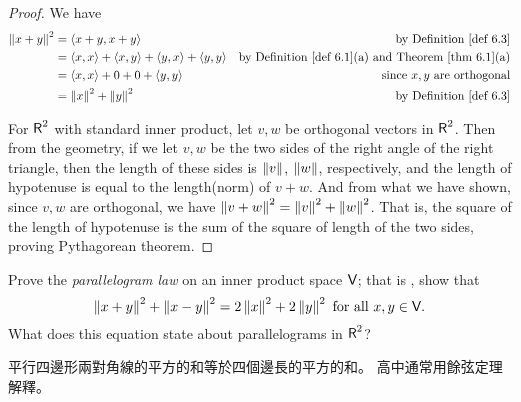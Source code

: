 \begin{proof}
We have
\begin{align*}
    \norm{x + y}^2 & = \LG x + y, x + y \RG & \text{by \DEF{6.3}} \\
        & = \LG x, x \RG + \LG x, y \RG + \LG y, x \RG + \LG y, y \RG & \text{by \DEF{6.1}(a) and \THM{6.1}(a)} \\
        & = \LG x, x \RG + 0 + 0 + \LG y, y \RG & \text{since \(x, y\) are orthogonal} \\
        & = \norm{x}^2 + \norm{y}^2 & \text{by \DEF{6.3}}
\end{align*}

For \(\textsf{R}^2\) with standard inner product, let \(v, w\) be orthogonal vectors in \(\textsf{R}^2\).
Then from the geometry, if we let \(v, w\) be the two sides of the right angle of the right triangle, then the length of these sides is \(\left\lVert v\right\rVert\), \(\left\lVert w\right\rVert\), respectively, and the length of hypotenuse is equal to the length(norm) of \(v + w\).
And from what we have shown, since \(v, w\) are orthogonal, we have \(\left\lVert v + w\right\rVert^2 = \left\lVert v\right\rVert^2 + \left\lVert w\right\rVert^2\).
That is, the square of the length of hypotenuse is the sum of the square of length of the two sides, proving Pythagorean theorem.
\end{proof}

\begin{exercise} \label{exercise 6.1.11}
Prove the \emph{parallelogram law} on an inner product space \(\textsf{V}\); that is , show that
\[
    \left\lVert x + y\right\rVert^2 + \left\lVert x - y\right\rVert^2 = 2\left\lVert x\right\rVert^2 + 2\left\lVert y\right\rVert^2 \text{ for all } x, y \in \textsf{V}.
\]
What does this equation state about parallelograms in \(\textsf{R}^2\)?
\end{exercise}

\begin{note}
平行四邊形兩對角線的平方的和等於四個邊長的平方的和。
高中通常用餘弦定理解釋。
\end{note}

